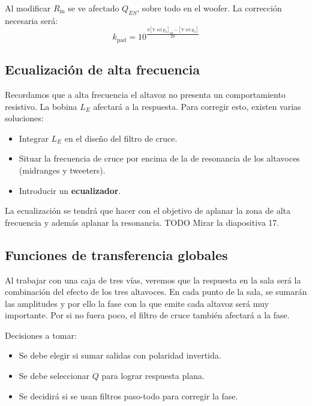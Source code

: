 \documentclass[12pt, a4paper]{article}
\begin{document}
Al modificar $R _{\text{in}}$ se ve afectado $Q_{ES}$, sobre todo en el woofer. La corrección necesaria será:
\begin{equation} \label{eq:correccion_niveles}
    k _{\text{pad}} = 10^{\frac{S \left[ \unit{\volt} \text{ rel } p_0\right] _{\text{ref}} - \left[ \unit{\volt} \text{ rel } p_0 \right] }{20}} 
\end{equation}

\subsection{Ecualización de alta frecuencia}

Recordamos que a alta frecuencia el altavoz no presenta un comportamiento resistivo. La bobina $L_E$ afectará a la respuesta. Para corregir esto, existen varias soluciones:
\begin{itemize}
    \item Integrar $L_E$ en el diseño del filtro de cruce.
    \item Situar la frecuencia de cruce por encima de la de resonancia de los altavoces (midranges y tweeters).
    \item Introducir un \textbf{ecualizador}.
\end{itemize}

La ecualización se tendrá que hacer con el objetivo de aplanar la zona de alta frecuencia y además aplanar la resonancia. TODO Mirar la diapositiva 17.

\subsection{Funciones de transferencia globales}

Al trabajar con una caja de tres vías, veremos que la respuesta en la sala será la combinación del efecto de los tres altavoces. En cada punto de la sala, se sumarán las amplitudes y por ello la fase con la que emite cada altavoz será muy importante. Por si no fuera poco, el filtro de cruce también afectará a la fase.

Decisiones a tomar:
\begin{itemize}
    \item Se debe elegir si sumar salidas con polaridad invertida.
    \item Se debe seleccionar $Q$ para lograr respuesta plana.
    \item Se decidirá si se usan filtros paso-todo para corregir la fase. 
\end{itemize}
\end{document}
